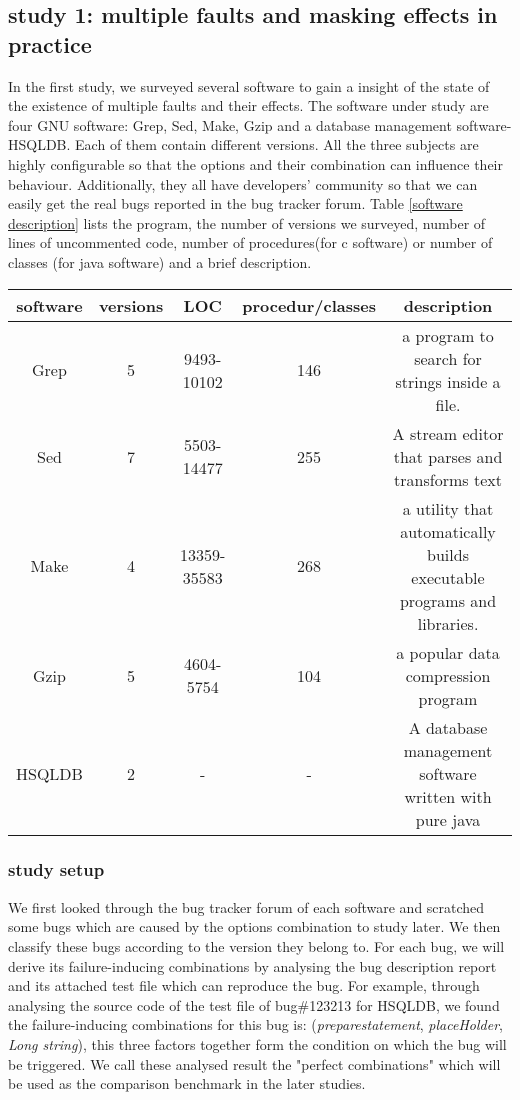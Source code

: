 \documentclass{sig-alternate}
\begin{document}
\subsection{study 1: multiple faults and masking effects in practice}
In the first study, we surveyed several software to gain a insight of the state of the existence of multiple faults and their effects. The software under study are four GNU software: Grep, Sed, Make, Gzip and a database management software- HSQLDB. Each of them contain different versions. All the three subjects are highly configurable so that the options and their combination can influence their behaviour. Additionally, they all have developers' community so that we can easily get the real bugs reported in the bug tracker forum. Table \ref{software description} lists the program, the number of versions we surveyed, number of lines of uncommented code, number of procedures(for c software) or number of classes (for java software) and a brief description.

\begin{table*}\renewcommand{\arraystretch}{1.3}
\caption{Software under survey}
\label{software description}
\begin{tabular}{c|c|c|c|c} \hline
software & versions & LOC & procedur/classes & description\\ \hline
Grep & 5 &  9493-10102 &146 &  a program to search for strings inside a file.\\ \hline
Sed & 7 & 5503-14477  & 255& A stream editor that parses and transforms text \\ \hline
Make & 4 &  13359-35583 &268&   a utility that automatically builds executable programs and libraries. \\ \hline
Gzip &5 &  4604-5754 &104&  a popular data compression program \\ \hline
HSQLDB &2 & - &-& A database management software written with pure java\\
\hline\end{tabular}
\end{table*}

\subsubsection{study setup}
We first looked through the bug tracker forum of each software and scratched some bugs which are caused by the options combination to study later. We then classify these bugs according to the version they belong to. For each bug, we will derive its failure-inducing combinations by analysing the bug description report and its attached test file which can reproduce the bug. For example, through analysing the source code of the test file of bug\#123213 for HSQLDB, we found the failure-inducing combinations for this bug is: (\emph{preparestatement}, \emph{placeHolder}, \emph{Long string}), this three factors together form the condition on which the bug will be triggered.  We call these analysed result the "perfect combinations" which will be used as the comparison benchmark in the later studies. 
\end{document}
